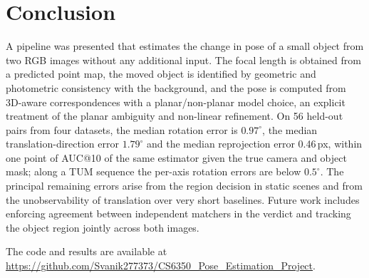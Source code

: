 \documentclass[journal]{IEEEtran}
\begin{document}
\section{Conclusion}
A pipeline was presented that estimates the change in pose of a small object from two RGB images without any additional input. The focal length is obtained from a predicted point map, the moved object is identified by geometric and photometric consistency with the background, and the pose is computed from 3D-aware correspondences with a planar/non-planar model choice, an explicit treatment of the planar ambiguity and non-linear refinement. On 56 held-out pairs from four datasets, the median rotation error is $0.97^\circ$, the median translation-direction error $1.79^\circ$ and the median reprojection error 0.46\,px, within one point of AUC@10 of the same estimator given the true camera and object mask; along a TUM sequence the per-axis rotation errors are below $0.5^\circ$. The principal remaining errors arise from the region decision in static scenes and from the unobservability of translation over very short baselines. Future work includes enforcing agreement between independent matchers in the verdict and tracking the object region jointly across both images.

The code and results are available at \url{https://github.com/Svanik277373/CS6350_Pose_Estimation_Project}.
\end{document}
